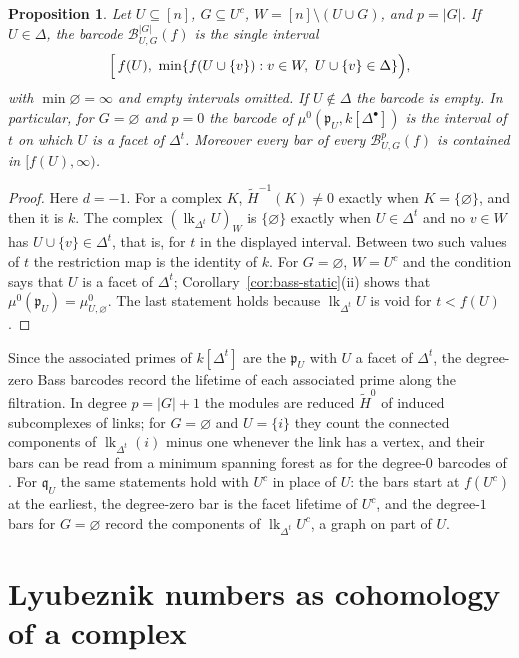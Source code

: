 \documentclass[11pt]{article}
\theoremstyle{plain}
\newtheorem{proposition}[theorem]{Proposition}
\theoremstyle{definition}
\newcommand{\kk}{k}
\newcommand{\pp}{\mathfrak{p}}
\newcommand{\link}{\operatorname{lk}}
\newcommand{\rH}{\widetilde{H}}
\begin{document}
\begin{proposition}\label{prop:bass-bars}
Let $U\subseteq[n]$, $G\subseteq U^c$, $W=[n]\setminus(U\cup G)$, and $p=|G|$. If $U\in\Delta$, the barcode
$\mathcal B^{|G|}_{U,G}(f)$ is the single interval
\[
\Bigl[\,f(U),\ \min\{f(U\cup\{v\}):v\in W,\ U\cup\{v\}\in\Delta\}\Bigr),
\]
with $\min\varnothing=\infty$ and empty intervals omitted. If $U\notin\Delta$ the barcode is empty. In
particular, for $G=\varnothing$ and $p=0$ the barcode of $\mu^0(\pp_U,\kk[\Delta^\bullet])$ is the interval of
$t$ on which $U$ is a facet of $\Delta^t$. Moreover every bar of every $\mathcal B^p_{U,G}(f)$ is contained in
$[f(U),\infty)$.
\end{proposition}

\begin{proof}
Here $d=-1$. For a complex $K$, $\rH^{-1}(K)\neq0$ exactly when $K=\{\varnothing\}$, and then it is $\kk$.
The complex $(\link_{\Delta^t}U)_W$ is $\{\varnothing\}$ exactly when $U\in\Delta^t$ and no $v\in W$ has
$U\cup\{v\}\in\Delta^t$, that is, for $t$ in the displayed interval. Between two such values of $t$ the
restriction map is the identity of $\kk$. For $G=\varnothing$, $W=U^c$ and the condition says that $U$ is a
facet of $\Delta^t$; Corollary~\ref{cor:bass-static}(ii) shows that $\mu^0(\pp_U)=\mu^0_{U,\varnothing}$. The
last statement holds because $\link_{\Delta^t}U$ is void for $t<f(U)$.
\end{proof}

Since the associated primes of $\kk[\Delta^t]$ are the $\pp_U$ with $U$ a facet of $\Delta^t$, the degree-zero
Bass barcodes record the lifetime of each associated prime along the filtration. In degree
$p=|G|+1$ the modules are reduced $\rH^0$ of induced subcomplexes of links; for $G=\varnothing$ and
$U=\{i\}$ they count the connected components of $\link_{\Delta^t}(i)$ minus one whenever the link has a
vertex, and their bars can be read from a minimum spanning forest as for the degree-$0$ barcodes of
\cite{HeSuwayyidWei}. For $\mathfrak q_U$ the same statements hold with $U^c$ in place of $U$: the bars start at
$f(U^c)$ at the earliest, the degree-zero bar is the facet lifetime of $U^c$, and the degree-$1$ bars for
$G=\varnothing$ record the components of $\link_{\Delta^t}U^c$, a graph on part of $U$.

\section{Lyubeznik numbers as cohomology of a complex}\label{sec:lyub-static}
\end{document}
